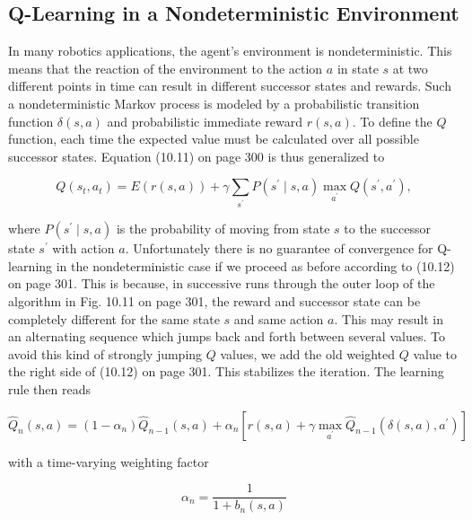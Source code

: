 \documentclass[10pt]{book}
\begin{document}
\subsection{Q-Learning in a Nondeterministic Environment}
In many robotics applications, the agent's environment is nondeterministic. This means that the reaction of the environment to the action $a$ in state $s$ at two different points in time can result in different successor states and rewards. Such a nondeterministic Markov process is modeled by a probabilistic transition function $\delta(s, a)$ and probabilistic immediate reward $r(s, a)$. To define the $Q$ function, each time the expected value must be calculated over all possible successor states. Equation (10.11) on page 300 is thus generalized to


\begin{equation*}
Q\left(s_{t}, a_{t}\right)=E(r(s, a))+\gamma \sum_{s^{\prime}} P\left(s^{\prime} \mid s, a\right) \max _{a^{\prime}} Q\left(s^{\prime}, a^{\prime}\right), \tag{10.13}
\end{equation*}


where $P\left(s^{\prime} \mid s, a\right)$ is the probability of moving from state $s$ to the successor state $s^{\prime}$ with action $a$. Unfortunately there is no guarantee of convergence for Q-learning in the nondeterministic case if we proceed as before according to (10.12) on page 301. This is because, in successive runs through the outer loop of the algorithm in Fig. 10.11 on page 301, the reward and successor state can be completely different for the same state $s$ and same action $a$. This may result in an alternating sequence which jumps back and forth between several values. To avoid this kind of strongly jumping $Q$ values, we add the old weighted $Q$ value to the right side of (10.12) on page 301. This stabilizes the iteration. The learning rule then reads


\begin{equation*}
\hat{Q}_{n}(s, a)=\left(1-\alpha_{n}\right) \hat{Q}_{n-1}(s, a)+\alpha_{n}\left[r(s, a)+\gamma \max _{a^{\prime}} \hat{Q}_{n-1}\left(\delta(s, a), a^{\prime}\right)\right] \tag{10.14}
\end{equation*}


with a time-varying weighting factor

$$
\alpha_{n}=\frac{1}{1+b_{n}(s, a)}
$$
\end{document}
